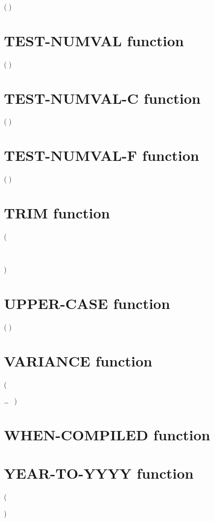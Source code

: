   ( \argument \argument )

\section{TEST-NUMVAL function}

  ( \argument )

\section{TEST-NUMVAL-C function}

  ( \argument \argument )

\section{TEST-NUMVAL-F function}

  ( \argument )

\section{TRIM function}

  ( \argument
\begin{0-1}
   \\
\end{0-1}
)

\section{UPPER-CASE function}

  ( \argument )

\section{VARIANCE function}

  (
\begin{1=}
  \argument
\end{1=}\ldots
\ {})

\section{WHEN-COMPILED function}

 

\section{YEAR-TO-YYYY function}

  ( \argument
\begin{0-1}
  \argument
  \begin{0-1}
    \argument
  \end{0-1}
\end{0-1}
)

